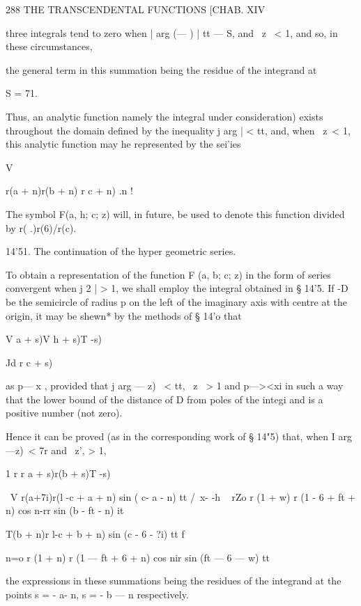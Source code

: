 288 THE TRANSCENDENTAL FUNCTIONS [CHAB. XIV

three integrals tend to zero when | arg (— ) | tt — S, and \ z \ < 1,
and so, in these circumstances,

the general term in this summation being the residue of the integrand
at

S = 71.

Thus, an analytic function namely the integral under consideration)
exists throughout the domain defined by the inequality j arg | < tt,
and, when \ z\ < 1, this analytic function may he represented by the
sei'ies



V



r(a + n)r(b + n) r c + n) .n !



The symbol F(a, h; c; z) will, in future, be used to denote this
function divided by r( .)r(6)/r(c).

14'51. The continuation of the hyper geometric series.

To obtain a representation of the function F (a, b; c; z) in the form
of series convergent when j 2 | > 1, we shall employ the integral
obtained in § 14'5. If -D be the semicircle of radius p on the left of
the imaginary axis with centre at the origin, it may be shewn* by the
methods of § 14'o that

V a + s)V h + s)T -s)



Jd r c + s)



as p— x , provided that j arg — z) \ < tt, \ z \ > 1 and p—><xi in
such a way that the lower bound of the distance of D from poles of the
integi and is a positive number (not zero).

Hence it can be proved (as in the corresponding work of § 14"5) that,
when I arg —z)\ < 7r and \ z', > 1,

1 r r a + s)r(b + s)T -s)

\ V r(a+7i)r(l -c + a + n) sin ( c- a - n) tt /\ x- -h ~ rZo r (1 + w)
r (1 - 6 + ft + n) cos n-rr sin (b - ft - n) it

  T(b + n)r l-c + b + n) sin (c - 6 - ?i) tt f \

n=o r (1 + n) r (1 — ft + 6 + n) cos nir sin (ft — 6 — w) tt

the expressions in these summations being the residues of the
integrand at the points s = - a- n, s = - b — n respectively.

